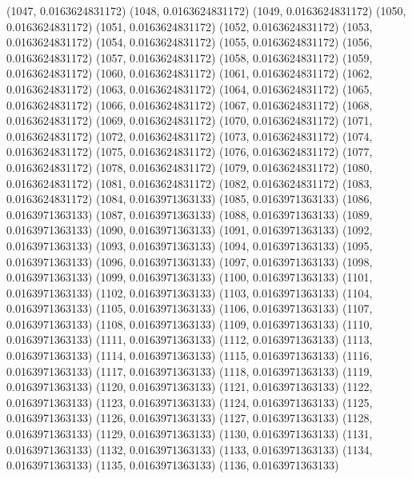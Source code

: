 {					(1047, 0.0163624831172)
					(1048, 0.0163624831172)
					(1049, 0.0163624831172)
					(1050, 0.0163624831172)
					(1051, 0.0163624831172)
					(1052, 0.0163624831172)
					(1053, 0.0163624831172)
					(1054, 0.0163624831172)
					(1055, 0.0163624831172)
					(1056, 0.0163624831172)
					(1057, 0.0163624831172)
					(1058, 0.0163624831172)
					(1059, 0.0163624831172)
					(1060, 0.0163624831172)
					(1061, 0.0163624831172)
					(1062, 0.0163624831172)
					(1063, 0.0163624831172)
					(1064, 0.0163624831172)
					(1065, 0.0163624831172)
					(1066, 0.0163624831172)
					(1067, 0.0163624831172)
					(1068, 0.0163624831172)
					(1069, 0.0163624831172)
					(1070, 0.0163624831172)
					(1071, 0.0163624831172)
					(1072, 0.0163624831172)
					(1073, 0.0163624831172)
					(1074, 0.0163624831172)
					(1075, 0.0163624831172)
					(1076, 0.0163624831172)
					(1077, 0.0163624831172)
					(1078, 0.0163624831172)
					(1079, 0.0163624831172)
					(1080, 0.0163624831172)
					(1081, 0.0163624831172)
					(1082, 0.0163624831172)
					(1083, 0.0163624831172)
					(1084, 0.0163971363133)
					(1085, 0.0163971363133)
					(1086, 0.0163971363133)
					(1087, 0.0163971363133)
					(1088, 0.0163971363133)
					(1089, 0.0163971363133)
					(1090, 0.0163971363133)
					(1091, 0.0163971363133)
					(1092, 0.0163971363133)
					(1093, 0.0163971363133)
					(1094, 0.0163971363133)
					(1095, 0.0163971363133)
					(1096, 0.0163971363133)
					(1097, 0.0163971363133)
					(1098, 0.0163971363133)
					(1099, 0.0163971363133)
					(1100, 0.0163971363133)
					(1101, 0.0163971363133)
					(1102, 0.0163971363133)
					(1103, 0.0163971363133)
					(1104, 0.0163971363133)
					(1105, 0.0163971363133)
					(1106, 0.0163971363133)
					(1107, 0.0163971363133)
					(1108, 0.0163971363133)
					(1109, 0.0163971363133)
					(1110, 0.0163971363133)
					(1111, 0.0163971363133)
					(1112, 0.0163971363133)
					(1113, 0.0163971363133)
					(1114, 0.0163971363133)
					(1115, 0.0163971363133)
					(1116, 0.0163971363133)
					(1117, 0.0163971363133)
					(1118, 0.0163971363133)
					(1119, 0.0163971363133)
					(1120, 0.0163971363133)
					(1121, 0.0163971363133)
					(1122, 0.0163971363133)
					(1123, 0.0163971363133)
					(1124, 0.0163971363133)
					(1125, 0.0163971363133)
					(1126, 0.0163971363133)
					(1127, 0.0163971363133)
					(1128, 0.0163971363133)
					(1129, 0.0163971363133)
					(1130, 0.0163971363133)
					(1131, 0.0163971363133)
					(1132, 0.0163971363133)
					(1133, 0.0163971363133)
					(1134, 0.0163971363133)
					(1135, 0.0163971363133)
					(1136, 0.0163971363133)
}
